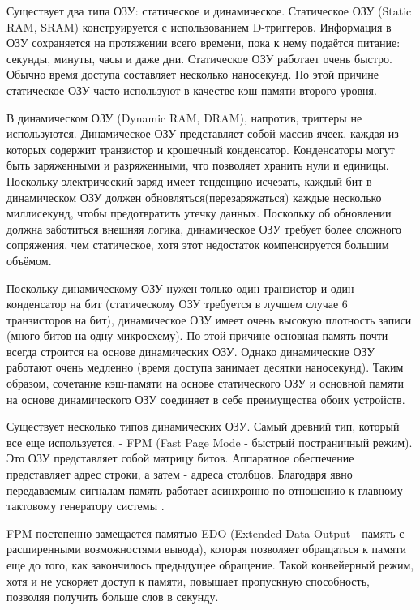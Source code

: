 Существует два типа ОЗУ: статическое и динамическое. Статическое ОЗУ (Static RAM, SRAM) конструируется с использованием D-триггеров. Информация в ОЗУ сохраняется на протяжении всего времени, пока к нему подаётся питание: секунды, минуты, часы и даже дни. Статическое ОЗУ работает очень быстро. Обычно время доступа составляет несколько наносекунд. По этой причине статическое ОЗУ часто используют в качестве кэш-памяти второго уровня.

В динамическом ОЗУ (Dynamic RAM, DRAM), напротив, триггеры не используются. Динамическое ОЗУ представляет собой массив ячеек, каждая из которых содержит транзистор и крошечный конденсатор. Конденсаторы могут быть заряженными и разряженными, что позволяет хранить нули и единицы. Поскольку электрический  заряд имеет тенденцию исчезать, каждый бит в динамическом ОЗУ должен обновляться(перезаряжаться) каждые несколько миллисекунд, чтобы предотвратить утечку данных. Поскольку об обновлении должна заботиться внешняя логика, динамическое ОЗУ требует более сложного сопряжения, чем статическое, хотя этот недостаток компенсируется большим объёмом.

Поскольку динамическому ОЗУ нужен только один транзистор и один конденсатор на бит (статическому ОЗУ требуется в лучшем случае 6 транзисторов на бит), динамическое ОЗУ имеет очень высокую плотность записи (много битов на одну микросхему). По этой причине основная память почти всегда строится на основе динамических ОЗУ. Однако динамические ОЗУ работают очень медленно (время доступа занимает десятки наносекунд). Таким образом, сочетание кэш-памяти на основе статического ОЗУ и основной памяти на основе динамического ОЗУ соединяет в себе преимущества обоих устройств.

Существует несколько типов динамических ОЗУ. Самый древний тип, который все еще используется, - FPM (Fast Page Mode - быстрый постраничный режим). Это ОЗУ представляет собой матрицу битов. Аппаратное обеспечение представляет адрес строки, а затем - адреса столбцов. Благодаря явно передаваемым сигналам память работает асинхронно по отношению к главному тактовому генератору системы \cite{dram_book}.

FPM постепенно замещается памятью EDO (Extended Data Output - память с расширенными возможностями вывода), которая позволяет обращаться к памяти еще до того, как закончилось предыдущее обращение. Такой конвейерный режим, хотя и не ускоряет доступ к памяти, повышает пропускную способность, позволяя получить больше слов в секунду.

